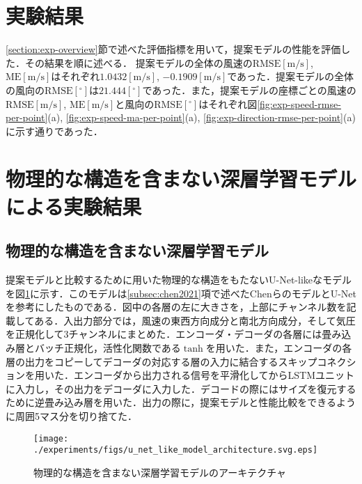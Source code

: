 \section{実験結果 \label{section:exp-results}}
\ref{section:exp-overview}節で述べた評価指標を用いて，提案モデルの性能を評価した．その結果を順に述べる．
提案モデルの全体の風速の$\mathrm{RMSE[m/s]}$, $\mathrm{ME[m/s]}$はそれぞれ$1.0432\mathrm{[m/s]}$, $-0.1909\mathrm{[m/s]}$であった．提案モデルの全体の風向の$\mathrm{RMSE[^\circ]}$は$21.444\mathrm{[^\circ]}$であった．また，提案モデルの座標ごとの風速の$\mathrm{RMSE[m/s]}$, $\mathrm{ME[m/s]}$と風向の$\mathrm{RMSE[^\circ]}$はそれぞれ図\ref{fig:exp-speed-rmse-per-point}(a), \ref{fig:exp-speed-ma-per-point}(a), \ref{fig:exp-direction-rmse-per-point}(a)に示す通りであった．

\section{物理的な構造を含まない深層学習モデルによる実験結果 \label{section:exp-results-without-physicial-structure}}

\subsection{物理的な構造を含まない深層学習モデル \label{subsection:exp-u-net-like-model}}
提案モデルと比較するために用いた物理的な構造をもたないU-Net-likeなモデルを図\ref{fig:exp-u-net-like-model}に示す．このモデルは\ref{subsec:chen2021}項で述べたChenらのモデルとU-Net\cite{journals/corr/RonnebergerFB15}を参考にしたものである．図中の各層の左に大きさを，上部にチャンネル数を記載してある．入出力部分では，風速の東西方向成分と南北方向成分，そして気圧を正規化して3チャンネルにまとめた．エンコーダ・デコーダの各層には畳み込み層とバッチ正規化\cite{10.5555/3045118.3045167}，活性化関数である$\tanh$を用いた．また，エンコーダの各層の出力をコピーしてデコーダの対応する層の入力に結合するスキップコネクションを用いた．エンコーダから出力される信号を平滑化してからLSTMユニットに入力し，その出力をデコーダに入力した．デコードの際にはサイズを復元するために逆畳み込み層を用いた．出力の際に，提案モデルと性能比較をできるように周囲5マス分を切り捨てた．

\begin{figure}[bp]
  \centering
  \texttt{[image: ./experiments/figs/u\_net\_like\_model\_architecture.svg.eps]}
  \caption{物理的な構造を含まない深層学習モデルのアーキテクチャ}
  \label{fig:exp-u-net-like-model}
\end{figure}


